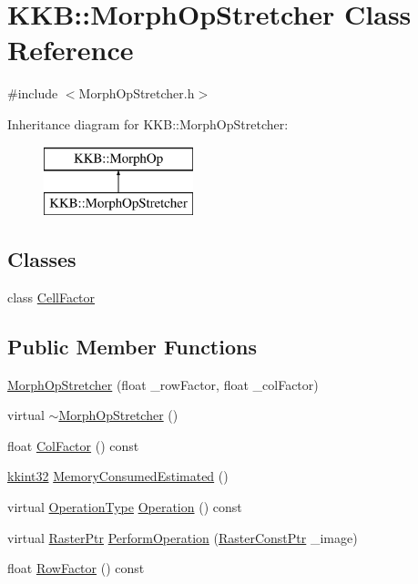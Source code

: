 \hypertarget{class_k_k_b_1_1_morph_op_stretcher}{}\section{K\+KB\+:\+:Morph\+Op\+Stretcher Class Reference}
\label{class_k_k_b_1_1_morph_op_stretcher}


{\ttfamily \#include $<$Morph\+Op\+Stretcher.\+h$>$}

Inheritance diagram for K\+KB\+:\+:Morph\+Op\+Stretcher\+:\begin{figure}[H]
\begin{center}
\leavevmode
\includegraphics[height=2.000000cm]{class_k_k_b_1_1_morph_op_stretcher}
\end{center}
\end{figure}
\subsection*{Classes}
\begin{DoxyCompactItemize}
\item 
class \hyperlink{class_morph_op_stretcher_1_1_cell_factor}{Cell\+Factor}
\end{DoxyCompactItemize}
\subsection*{Public Member Functions}
\begin{DoxyCompactItemize}
\item 
\hyperlink{class_k_k_b_1_1_morph_op_stretcher_a02436bb070c3d288612345b87bba7f8b}{Morph\+Op\+Stretcher} (float \+\_\+row\+Factor, float \+\_\+col\+Factor)
\item 
virtual \hyperlink{class_k_k_b_1_1_morph_op_stretcher_a57c9b92293b43107e2e5386f91c06ba0}{$\sim$\+Morph\+Op\+Stretcher} ()
\item 
float \hyperlink{class_k_k_b_1_1_morph_op_stretcher_a31b2b87a8bc43f2ea8bbe0ad77849be1}{Col\+Factor} () const 
\item 
\hyperlink{namespace_k_k_b_a8fa4952cc84fda1de4bec1fbdd8d5b1b}{kkint32} \hyperlink{class_k_k_b_1_1_morph_op_stretcher_a399a5b979f728370794babd0d5b03cfd}{Memory\+Consumed\+Estimated} ()
\item 
virtual \hyperlink{class_k_k_b_1_1_morph_op_a32070d9c14d16849873a8a409f5b0d69}{Operation\+Type} \hyperlink{class_k_k_b_1_1_morph_op_stretcher_afdf127ebc560ce9579355f2700952d92}{Operation} () const 
\item 
virtual \hyperlink{namespace_k_k_b_a80d46bd24db644a022c863bce8ae3633}{Raster\+Ptr} \hyperlink{class_k_k_b_1_1_morph_op_stretcher_affcccf7e48ed632a97395f0b893eba3b}{Perform\+Operation} (\hyperlink{namespace_k_k_b_a5acfa7402dc4df1769f90d3dc8ddfc2c}{Raster\+Const\+Ptr} \+\_\+image)
\item 
float \hyperlink{class_k_k_b_1_1_morph_op_stretcher_af191abd6582f078f6d28d7c9ba3a8f2a}{Row\+Factor} () const 
\end{DoxyCompactItemize}
